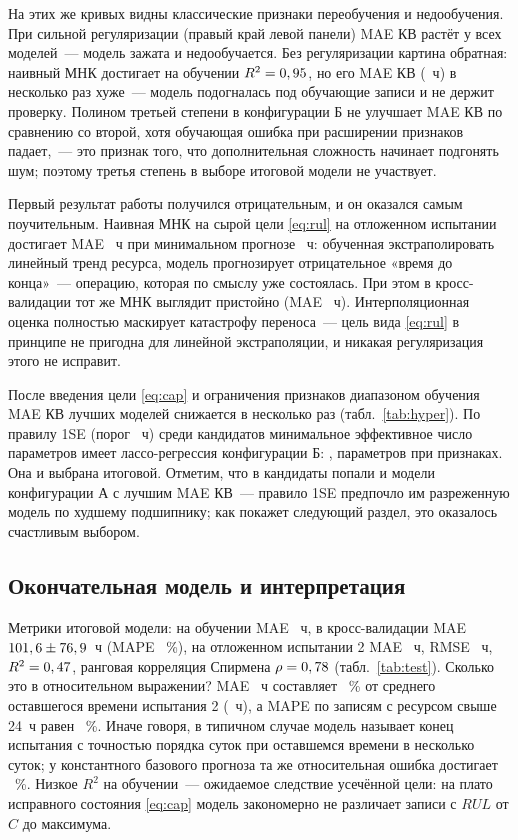 \documentclass[14pt,a4paper]{extarticle}
\begin{document}
На этих же кривых видны классические признаки переобучения и недообучения.
При сильной регуляризации (правый край левой панели) MAE КВ растёт у всех
моделей~--- модель зажата и недообучается. Без регуляризации картина
обратная: наивный МНК достигает на обучении $R^2=0,95$, но его
MAE КВ (\OlsMAECV~ч) в несколько раз хуже~--- модель подогналась под
обучающие записи и не держит проверку. Полином третьей степени в
конфигурации Б не улучшает MAE КВ по сравнению со второй, хотя обучающая
ошибка при расширении признаков падает,~--- это признак того, что
дополнительная сложность начинает подгонять шум; поэтому третья степень
в выборе итоговой модели не участвует.

Первый результат работы получился отрицательным, и он оказался самым
поучительным. Наивная МНК на сырой цели \eqref{eq:rul} на отложенном
испытании достигает MAE \OlsMAETest~ч при минимальном прогнозе
\OlsMinPred~ч: обученная экстраполировать линейный тренд ресурса, модель
прогнозирует отрицательное «время до конца»~--- операцию, которая по смыслу
уже состоялась. При этом в кросс-валидации тот же МНК выглядит пристойно
(MAE \OlsMAECV~ч). Интерполяционная оценка полностью маскирует катастрофу
переноса~--- цель вида \eqref{eq:rul} в принципе не пригодна для линейной
экстраполяции, и никакая регуляризация этого не исправит.

После введения цели \eqref{eq:cap} и ограничения признаков диапазоном
обучения MAE КВ лучших моделей снижается в несколько раз
(табл.~\ref{tab:hyper}). По правилу 1SE (порог \BestThrOneSE~ч) среди
кандидатов минимальное эффективное число параметров имеет лассо-регрессия
конфигурации Б: \BestHyper, \BestDof{} параметров при \BestNFeat{} признаках.
Она и выбрана итоговой. Отметим, что в кандидаты попали и модели
конфигурации А с лучшим MAE КВ~--- правило 1SE предпочло им разреженную
модель по худшему подшипнику; как покажет следующий раздел, это оказалось
счастливым выбором.

\subsection{Окончательная модель и интерпретация}

Метрики итоговой модели: на обучении MAE \BestMAETrain~ч, в кросс-валидации
MAE $101,6 \pm 76,9$~ч (MAPE \BestMAPETestCV{}~\%), на
отложенном испытании 2 MAE \BestMAETest~ч, RMSE \BestRMSETest~ч,
$R^2 = 0,47$, ранговая корреляция Спирмена $\rho = 0,78$
(табл.~\ref{tab:test}). Сколько это в относительном выражении? MAE
\BestMAETest~ч составляет \BestNMAETest~\% от среднего оставшегося времени
испытания 2 (\MeanRulTest~ч), а MAPE по записям с ресурсом свыше 24~ч
равен \BestMAPETest~\%. Иначе говоря, в типичном случае модель называет
конец испытания с точностью порядка суток при оставшемся времени
в несколько суток; у константного базового прогноза та же относительная
ошибка достигает \BestNMAETestBase~\%. Низкое $R^2$ на обучении~---
ожидаемое следствие усечённой цели: на плато исправного состояния
\eqref{eq:cap} модель закономерно не различает записи с $RUL$ от $C$
до максимума.
\end{document}
